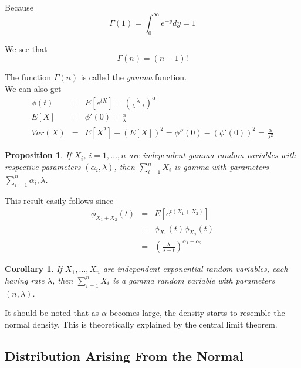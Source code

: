 \documentclass[12pt]{article}
\newtheorem{corollary}[theorem]{Corollary}
\newtheorem{proposition}[theorem]{Proposition}
\begin{document}
Because
\begin{equation*}
  \Gamma (1) = \int_0^{\infty} e^{-y} dy = 1
\end{equation*}

We see that
\begin{equation*}
  \Gamma (n) = (n-1)!
\end{equation*}

The function $\Gamma (n)$ is called the \emph{gamma} function. \\

We can also get
\begin{eqnarray*}
  \phi (t)
  &=& E[e^{tX}] = \left( \frac{\lambda}{\lambda - t} \right)^{\alpha} \\
  E[X]
  &=& \phi '(0) = \frac {\alpha}{\lambda} \\
  Var(X)
  &=& E[X^2] - (E[X])^2 = \phi ''(0) - \left( \phi '(0) \right)^2
  = \frac{\alpha}{\lambda^2}
\end{eqnarray*}

\begin{proposition}
  If $X_i$, $i=1,\dots,n$ are independent gamma random variables with respective parameters $(\alpha_i, \lambda)$, then $\sum_{i=1}^n X_i$ is gamma with parameters $\sum_{i=1}^n \alpha_i, \lambda$.
\end{proposition}

This result easily follows since
\begin{eqnarray*}
  \phi_{X_1+X_2} (t)
  &=& E[e^{t(X_1 + X_2)}] \\
  &=& \phi_{X_1} (t) \phi_{X_2} (t) \\
  &=& \left( \frac{\lambda}{\lambda - t} \right)^{\alpha_1 + \alpha_2}
\end{eqnarray*}

\begin{corollary}
  If $X_1,\dots,X_n$ are independent exponential random variables, each having rate $\lambda$, then $\sum_{i=1}^n X_i$ is a gamma random variable with parameters $(n, \lambda)$.
\end{corollary}

It should be noted that as $\alpha$ becomes large, the density starts to resemble the normal density. This is theoretically explained by the central limit theorem.

\subsection{Distribution Arising From the Normal}
\end{document}
